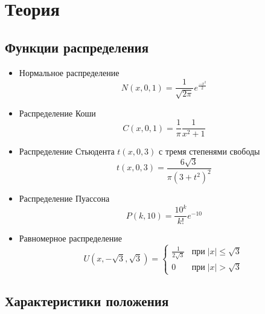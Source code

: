 \section{Теория}
\subsection{Функции распределения}
\begin{itemize}
    \item Нормальное распределение 
    \begin{equation}
        N(x, 0, 1) = \frac{1}{\sqrt{2\pi}}e^\frac{-x^2}{2}
        \label{eq1}
    \end{equation}
    
    \item Распределение Коши 
    \begin{equation}
       C(x, 0, 1) = \frac{1}{\pi}\frac{1}{x^2+1}
       \label{eq2}
    \end{equation}
    
    \item Распределение Стьюдента $t(x, 0, 3)$ с тремя степенями свободы
     \begin{equation}
       t(x, 0, 3) = \frac{6\sqrt3}{\pi(3 + t^2)^2}
       \label{eq3}
    \end{equation}
    
    \item Распределение Пуассона 
     \begin{equation}
       P(k, 10) = \frac{10^k}{k!}e^{-10}
       \label{eq4}
    \end{equation}
    
    \item Равномерное распределение 
     \begin{equation}
       U(x, -\sqrt3, \sqrt3) = \begin{cases}
       \frac{1}{2\sqrt3} & \mbox{при} \; |x| \leq \sqrt3\\
       0 & \mbox{при} \; |x| > \sqrt3
       \end{cases}
       \label{eq5}
    \end{equation}
    
\end{itemize}

\subsection{Характеристики положения}

